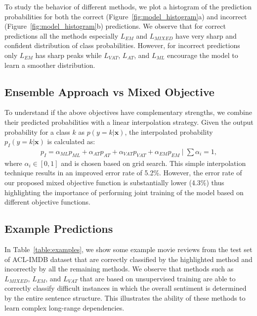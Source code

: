 \documentclass[letterpaper]{article}
\begin{document}
To study the behavior of different methods, we plot a histogram of the prediction probabilities for both the correct (Figure~\ref{fig:model_histogram}a) and incorrect (Figure~\ref{fig:model_histogram}b) predictions.
We observe that for correct predictions all the methods especially $L_{\textit{EM}}$ and $L_{\textit{MIXED}}$ have very sharp and confident distribution of class probabilities. However, for incorrect predictions only $L_{\textit{EM}}$ has sharp peaks while $L_{\textit{VAT}}$, $L_{\textit{AT}}$, and $L_{\textit{ML}}$ encourage the model to learn a smoother distribution.

\subsection{Ensemble Approach vs Mixed Objective}
To understand if the above objectives have complementary strengths, we combine their predicted probabilities with a linear interpolation strategy. Given the output probability for a class $k$ as $p(y=k|\mathbf{x})$, the interpolated probability $p_{\textit{I}}(y=k|\mathbf{x})$ is calculated as:
\begin{align*}
p_{\textit{I}} = \alpha_{\textit{ML}} p_{\textit{ML}} + \alpha_{\textit{AT}} p_{\textit{AT}} + \alpha_{\textit{VAT}} p_{\textit{VAT}} + \alpha_{\textit{EM}} p_{\textit{EM}} \mid \sum\alpha_{\textit{i}} = 1,
\end{align*}
where $\alpha_{\textit{i}} \in [0, 1]$ and is chosen based on grid search. This simple interpolation technique results in an improved error rate of 5.2\%. However, the error rate of our proposed mixed objective function is substantially lower (4.3\%) thus highlighting the importance of performing joint training of the model based on different objective functions.

\subsection{Example Predictions}
In Table~\ref{table:examples}, we show some example movie reviews from the test set of ACL-IMDB dataset that are correctly classified by the highlighted method and incorrectly by all the remaining methods. We observe that methods such as $L_{\textit{MIXED}}$, $L_{\textit{EM}}$, and $L_{\textit{VAT}}$ that are based on unsupervised training are able to correctly classify difficult instances in which the overall sentiment is determined by the entire sentence structure. This illustrates the ability of these methods to learn complex long-range dependencies.
\end{document}

